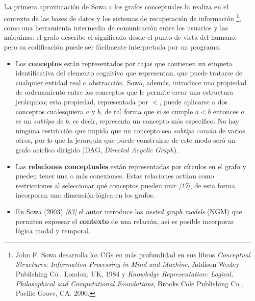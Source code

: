 \documentclass[a4paper,12pt,spanish]{book}
\begin{document}
La primera aproximación de Sowa a los grafos conceptuales la realiza en el contexto
de las bases de datos y los sistemas de recuperación de información \footnote{
John F. Sowa desarrolla los CGs en más profundidad en sus libros
\emph{Conceptual Structures: Information Processing in Mind and Machine}, Addison Wesley
Publishing Co., London, UK, 1984 y \emph{Knowledge Representation: Logical, Philosophical and
Computational Foundations}, Brooks Cole Publishing Co., Pacific Grove, CA, 2000.
}, como una herramienta
intermedia de comunicación entre los usuarios y las máquinas: el grafo describe el
significado desde el punto de vista del humano, pero su codificación puede ser fácilmente
interpretada por un programa:
\begin{itemize}
\item {} 
Los \textbf{conceptos} están representados por cajas que contienen un etiqueta identificativa
del elemento cognitivo que representan, que puede tratarse de cualquier entidad real o
abstracción. Sowa, además, introduce una propiedad de ordenamiento entre los conceptos
que le permite crear una estructura jerárquica; esta propiedad, representada por \(<\),
puede aplicarse a dos conceptos cualesquiera \(a\) y \(b\), de tal forma que
si se cumple \(a < b\) entonces \(a\) es un \emph{subtipo} de \(b\), es decir,
representa un concepto más específico. No hay ninguna restricción que impida que un
concepto sea \emph{subtipo común} de varios otros, por lo que la jerarquía que puede
construirse de este modo será un grafo acíclico dirigido (DAG, \emph{Directed Acyclic Graph}).

\item {} 
Las \textbf{relaciones conceptuales} están representadas por círculos en el grafo y pueden tener una
o más conexiones. Estas relaciones actúan como restricciones al seleccionar qué conceptos
pueden unir \label{1.state-of-the-art/i.representacion-conocimiento:id14}{\hyperref[zreferences:clancey1985]{\emph{{[}17{]}}}}, de esta forma incorporan una dimensión lógica en los grafos.

\item {} 
En Sowa (2003) \label{1.state-of-the-art/i.representacion-conocimiento:id15}{\hyperref[zreferences:sowa2003]{\emph{{[}83{]}}}} el autor introduce los \emph{nested graph models} (NGM) que
permiten expresar el \textbf{contexto} de una relación, así es posible incorporar lógica modal y
temporal.

\end{itemize}
\end{document}
